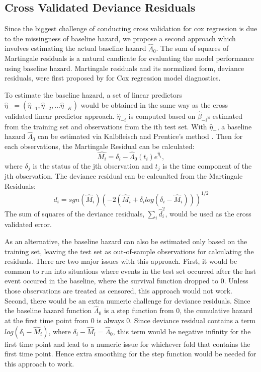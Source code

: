 \documentclass{article}\usepackage[]{graphicx}\usepackage[]{color}
\begin{document}
  \subsection{Cross Validated Deviance Residuals}
Since the biggest challenge of conducting cross validation for cox regression is due to the missingness of baseline hazard, we propose a second approach which involves estimating the actual baseline hazard $\hat{\Lambda}_{0}$. The sum of squares of Martingale residuals is a natural candicate for evaluating the model performance using baseline hazard. Martingale residuals and its normalized form, deviance residuals, were first proposed by \citep{Therneau1990} for Cox regression model diagnostics. 

To estimate the baseline hazard, a set of linear predictors $\hat{\eta}_{-} = ( \hat{\eta}_{-1},  \hat{\eta}_{-2} , ...  \hat{\eta}_{-K})$ would be obtained in the same way as the cross validated linear predictor approach. $\hat{\eta}_{-i}$ is computed based on $\hat{\beta}_{-i}$s estimated from the training set and observations from the ith test set. With $\hat{\eta}_{-}$, a baseline hazard $\hat{\Lambda}_{0}$ can be estimated via Kalbfleisch and Prentice's method \citep{Kalbfleisch2011}. Then for each observations, the Martingale Residual can be calculated: \begin{equation}\hat{M_{i}} = \delta_{i} -\hat{\Lambda}_{0}(t_{i})e^{\hat{\eta}_{i}},\end{equation} where $\delta_{j}$ is the status of the jth observation and $t_{j}$ is the time component of the jth observation. The deviance residual can be calcualted from the Martingale Residuals: \begin{equation} d_{i} = sgn(\hat{M}_{i})(-2(\hat{M}_{i} + \delta_{i}log(\delta_{i} - \hat{M}_{i})))^{1/2}\end{equation} The sum of squares of the deviance residuals, $\sum_{i}\hat{d}_{i}^2$, would be used as the cross validated error.

As an alternative, the baseline hazard can also be estimated only based on the training set, leaving the test set as out-of-sample observations for calculating the residuals. There are two major issues with this approach. First, it would be common to run into situations where events in the test set occurred after the last event occured in the baseline, where the survival function dropped to 0. Unless those observations are treated as censored, this approach would not work. Second, there would be an extra numeric challenge for deviance residuals. Since the baseline hazard function $\hat{\Lambda}_{0}$ is a step function from 0, the cumulative hazard at the first time point from 0 is always 0. Since deviance residual contains a term $log(\delta_{i} - \hat{M}_{i})$, where $\delta_{i} - \hat{M}_{i} = \hat{\Lambda}_{0}$, this term would be negative infinity for the first time point and lead to a numeric issue for whichever fold that contains the first time point. Hence extra smoothing for the step function would be needed for this approach to work.
\end{document}
